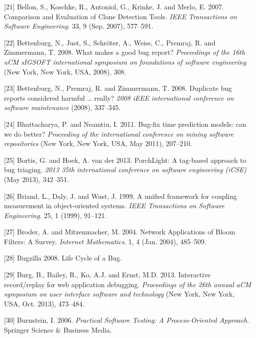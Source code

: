 \documentclass[12pt]{report}
\begin{document}
\hypertarget{ref-Bellon2007}{}
{[}21{]} Bellon, S., Koschke, R., Antoniol, G., Krinke, J. and Merlo, E.
2007. Comparison and Evaluation of Clone Detection Tools. \emph{IEEE
Transactions on Software Engineering}. 33, 9 (Sep. 2007), 577--591.

\hypertarget{ref-Bettenburg2008}{}
{[}22{]} Bettenburg, N., Just, S., Schröter, A., Weiss, C., Premraj, R.
and Zimmermann, T. 2008. What makes a good bug report? \emph{Proceedings
of the 16th aCM sIGSOFT international symposium on foundations of
software engineering} (New York, New York, USA, 2008), 308.

\hypertarget{ref-Bettenburg2008a}{}
{[}23{]} Bettenburg, N., Premraj, R. and Zimmermann, T. 2008. Duplicate
bug reports considered harmful \ldots{} really? \emph{2008 iEEE
international conference on software maintenance} (2008), 337--345.

\hypertarget{ref-Bhattacharya2011}{}
{[}24{]} Bhattacharya, P. and Neamtiu, I. 2011. Bug-fix time prediction
models: can we do better? \emph{Proceeding of the international
conference on mining software repositories} (New York, New York, USA,
May 2011), 207--210.

\hypertarget{ref-Bortis2013}{}
{[}25{]} Bortis, G. and Hoek, A. van der 2013. PorchLight: A tag-based
approach to bug triaging. \emph{2013 35th international conference on
software engineering (iCSE)} (May 2013), 342--351.

\hypertarget{ref-Briand1999a}{}
{[}26{]} Briand, L., Daly, J. and Wust, J. 1999. A unified framework for
coupling measurement in object-oriented systems. \emph{IEEE Transactions
on Software Engineering}. 25, 1 (1999), 91--121.

\hypertarget{ref-Broder2004}{}
{[}27{]} Broder, A. and Mitzenmacher, M. 2004. Network Applications of
Bloom Filters: A Survey. \emph{Internet Mathematics}. 1, 4 (Jan. 2004),
485--509.

\hypertarget{ref-Bugzilla2008}{}
{[}28{]} Bugzilla 2008. Life Cycle of a Bug.

\hypertarget{ref-Burg2013}{}
{[}29{]} Burg, B., Bailey, R., Ko, A.J. and Ernst, M.D. 2013.
Interactive record/replay for web application debugging.
\emph{Proceedings of the 26th annual aCM symposium on user interface
software and technology} (New York, New York, USA, Oct. 2013), 473--484.

\hypertarget{ref-Burnstein2006}{}
{[}30{]} Burnstein, I. 2006. \emph{Practical Software Testing: A
Process-Oriented Approach}. Springer Science \& Business Media.
\end{document}
